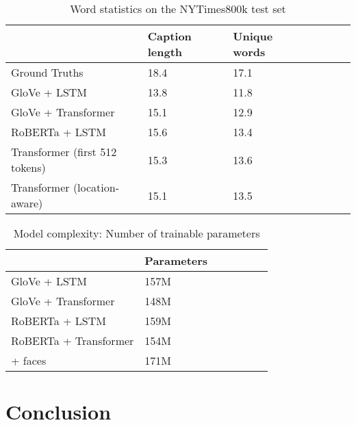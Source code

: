 \documentclass[10pt,twocolumn,letterpaper]{article}
\begin{document}
\begin{table*}[t]
	\caption {Word statistics on the NYTimes800k test set}
	\label{tab:results-stats}
	\centering
	\begin{tabular}{lllllll}
		\toprule
        & Caption length  & Unique words \\
      \midrule
      Ground Truths & 18.4 & 17.1 \\
      GloVe + LSTM  & 13.8 & 11.8 \\
      GloVe + Transformer  & 15.1 & 12.9 \\
      RoBERTa + LSTM  & 15.6 & 13.4 \\
      Transformer (first 512 tokens)  & 15.3 & 13.6 \\
      Transformer (location-aware) & 15.1 & 13.5  \\
		\bottomrule
	\end{tabular}
\end{table*}


\begin{table*}[t]
	\caption {Model complexity: Number of trainable parameters}
	\label{tab:models}
	\centering
	\begin{tabular}{lllllll}
		\toprule
        & Parameters \\
      \midrule
      GloVe + LSTM & 157M \\
      GloVe + Transformer & 148M \\
      RoBERTa + LSTM & 159M \\
      RoBERTa + Transformer & 154M \\
        + faces & 171M \\
		\bottomrule
	\end{tabular}
\end{table*}

\section{Conclusion}

{\small


}
\end{document}
